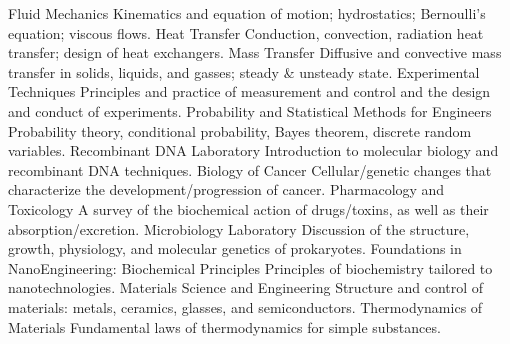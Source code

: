 \begin{cvskills}
\cvskill
    {Fluid Mechanics} %
    {Kinematics and equation of motion; hydrostatics; Bernoulli’s equation; viscous flows.} %
\cvskill
    {Heat Transfer} %
    {Conduction, convection, radiation heat transfer; design of heat exchangers. } %
\cvskill
    {Mass Transfer} %
    {Diffusive and convective mass transfer in solids, liquids, and gasses; steady \& unsteady state.} %
\cvskill
    {Experimental Techniques} %
    {Principles and practice of measurement and control and the design and conduct of experiments.} %
\cvskill
    {Probability and Statistical Methods for Engineers} %
    {Probability theory, conditional probability, Bayes theorem, discrete random variables.} %
\cvskill
    {Recombinant DNA Laboratory} %
    {Introduction to molecular biology and recombinant DNA techniques.} %
\cvskill
    {Biology of Cancer} %
    {Cellular/genetic changes that characterize the development/progression of cancer.} %
\cvskill
    {Pharmacology and Toxicology} %
    {A survey of the biochemical action of drugs/toxins, as well as their absorption/excretion.} %
\cvskill
    {Microbiology Laboratory} %
    {Discussion of the structure, growth, physiology, and molecular genetics of prokaryotes.} %
\cvskill
    {Foundations in NanoEngineering: Biochemical Principles} %
    {Principles of biochemistry tailored to nanotechnologies.} %
\cvskill
    {Materials Science and Engineering} %
    {Structure and control of materials: metals, ceramics, glasses, and semiconductors.} %
\cvskill
    {Thermodynamics of Materials} %
    {Fundamental laws of thermodynamics for simple substances.} %
\cvskill

\end{cvskills}

